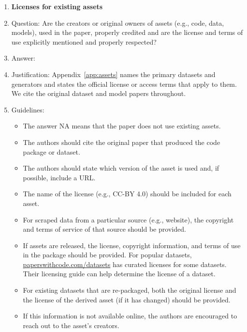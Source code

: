 \documentclass{article}
\begin{document}
\begin{enumerate}
\item {\bf Licenses for existing assets}
    \item[] Question: Are the creators or original owners of assets (e.g., code, data, models), used in the paper, properly credited and are the license and terms of use explicitly mentioned and properly respected?
    \item[] Answer: \answerYes{}
    \item[] Justification: Appendix~\ref{app:assets} names the primary datasets and generators and states the official license or access terms that apply to them. We cite the original dataset and model papers throughout.
    \item[] Guidelines:
    \begin{itemize}
        \item The answer NA means that the paper does not use existing assets.
        \item The authors should cite the original paper that produced the code package or dataset.
        \item The authors should state which version of the asset is used and, if possible, include a URL.
        \item The name of the license (e.g., CC-BY 4.0) should be included for each asset.
        \item For scraped data from a particular source (e.g., website), the copyright and terms of service of that source should be provided.
        \item If assets are released, the license, copyright information, and terms of use in the package should be provided. For popular datasets, \url{paperswithcode.com/datasets} has curated licenses for some datasets. Their licensing guide can help determine the license of a dataset.
        \item For existing datasets that are re-packaged, both the original license and the license of the derived asset (if it has changed) should be provided.
        \item If this information is not available online, the authors are encouraged to reach out to the asset's creators.
    \end{itemize}


\end{enumerate}
\end{document}
